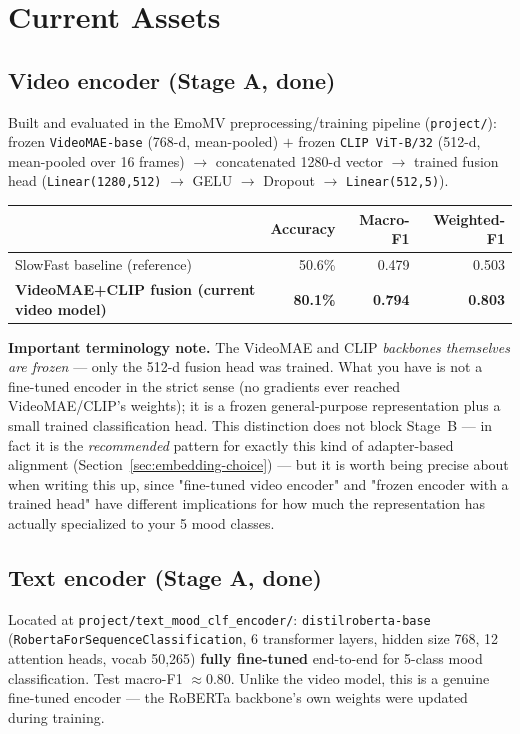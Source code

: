 \documentclass[11pt]{article}
\begin{document}
\section{Current Assets}

\subsection{Video encoder (Stage A, done)}
Built and evaluated in the EmoMV preprocessing/training pipeline (\texttt{project/}): frozen
\texttt{VideoMAE-base} (768-d, mean-pooled) $+$ frozen \texttt{CLIP ViT-B/32} (512-d, mean-pooled
over 16 frames) $\to$ concatenated 1280-d vector $\to$ trained fusion head
(\texttt{Linear(1280,512)} $\to$ GELU $\to$ Dropout $\to$ \texttt{Linear(512,5)}).

\begin{center}
\begin{tabular}{@{}lrrr@{}}
\toprule
& Accuracy & Macro-F1 & Weighted-F1 \\
\midrule
SlowFast baseline (reference) & 50.6\% & 0.479 & 0.503 \\
\textbf{VideoMAE+CLIP fusion (current video model)} & \textbf{80.1\%} & \textbf{0.794} & \textbf{0.803} \\
\bottomrule
\end{tabular}
\end{center}

\textbf{Important terminology note.} The VideoMAE and CLIP \emph{backbones themselves are frozen}
— only the 512-d fusion head was trained. What you have is not a fine-tuned encoder in the
strict sense (no gradients ever reached VideoMAE/CLIP's weights); it is a frozen general-purpose
representation plus a small trained classification head. This distinction does not block Stage~B
— in fact it is the \emph{recommended} pattern for exactly this kind of adapter-based alignment
(Section~\ref{sec:embedding-choice}) — but it is worth being precise about when writing this up,
since "fine-tuned video encoder" and "frozen encoder with a trained head" have different
implications for how much the representation has actually specialized to your 5 mood classes.

\subsection{Text encoder (Stage A, done)}
Located at \texttt{project/text\_mood\_clf\_encoder/}: \texttt{distilroberta-base}
(\texttt{RobertaForSequenceClassification}, 6 transformer layers, hidden size 768, 12 attention
heads, vocab 50{,}265) \textbf{fully fine-tuned} end-to-end for 5-class mood classification. Test
macro-F1 $\approx 0.80$. Unlike the video model, this is a genuine fine-tuned encoder — the
RoBERTa backbone's own weights were updated during training.
\end{document}
